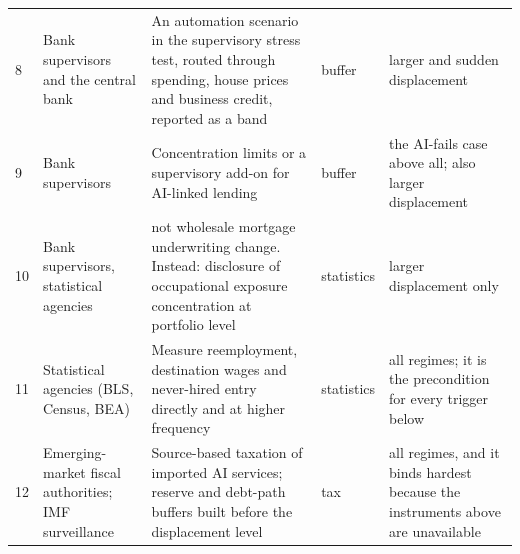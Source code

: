 \begin{longtable}{@{}p{0.4cm}p{3.0cm}p{5.0cm}p{1.4cm}p{3.4cm}@{}}
8 & Bank supervisors and the central bank & An automation scenario in the supervisory stress test, routed through spending, house prices and business credit, reported as a band & buffer & larger and sudden displacement \\
9 & Bank supervisors & Concentration limits or a supervisory add-on for AI-linked lending & buffer & the AI-fails case above all; also larger displacement \\
10 & Bank supervisors, statistical agencies & not wholesale mortgage underwriting change. Instead: disclosure of occupational exposure concentration at portfolio level & statistics & larger displacement only \\
11 & Statistical agencies (BLS, Census, BEA) & Measure reemployment, destination wages and never-hired entry directly and at higher frequency & statistics & all regimes; it is the precondition for every trigger below \\
12 & Emerging-market fiscal authorities; IMF surveillance & Source-based taxation of imported AI services; reserve and debt-path buffers built before the displacement level & tax & all regimes, and it binds hardest because the instruments above are unavailable \\
\end{longtable}
